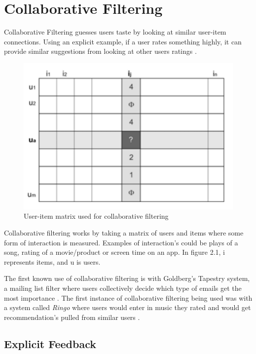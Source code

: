\section{Collaborative Filtering}

Collaborative Filtering guesses users taste by looking at similar user-item connections. Using an explicit example, if a user rates something highly, it can provide similar suggestions from looking at other users ratings \citep{celma_recommendation_2010}.

\begin{figure}[H]
	\includegraphics[scale=0.65]{images/collaborative_filtering}
	\centering
	\caption{User-item matrix used for collaborative filtering \citep{celma_recommendation_2010}} 
	\label{fig:figure}
\end{figure}

Collaborative filtering works by taking a matrix of users and items where some form of interaction is measured. Examples of interaction's could be plays of a song, rating of a movie/product or screen time on an app. In figure 2.1, i represents items, and u is users.

The first known use of collaborative filtering is with Goldberg's Tapestry system, a mailing list filter where users collectively decide which type of emails get the most importance \citep{goldberg_using_1992}. The first instance of collaborative filtering being used was with a system called \textit{Ringo} where users would enter in music they rated and would get recommendation's pulled from similar users \citep{shardanand_social_1995}. 

\subsection{Explicit Feedback}

